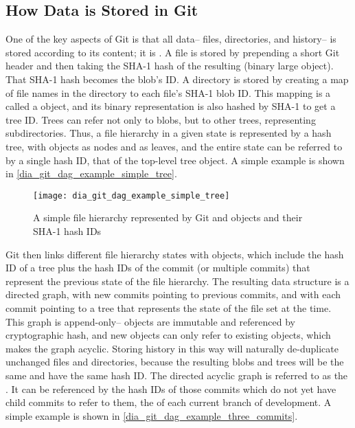 %


\subsection{How Data is Stored in Git}

One of the key aspects of Git is that all data-- files, directories, and
history-- is stored according to its content; it is . A file is stored by
prepending a short Git header and then taking the SHA-1 hash of the resulting
 (binary large object). That SHA-1 hash becomes the blob's ID. A
directory is stored by creating a map of file names in the directory to each
file's SHA-1 blob ID. This mapping is a called a  object, and its
binary representation is also hashed by SHA-1 to get a tree ID. Trees can refer
not only to blobs, but to other trees, representing subdirectories. Thus, a file
hierarchy in a given state is represented by a hash tree, with 
objects as nodes and  as leaves, and the entire state can be
referred to by a single hash ID, that of the top-level tree object. A simple
example is shown in \autoref{dia_git_dag_example_simple_tree}.

\begin{figure}[h]
    \centering
    \texttt{[image: dia\_git\_dag\_example\_simple\_tree]}
    \caption{A simple file hierarchy represented by Git  and
         objects and their SHA-1 hash IDs}
    \label{dia_git_dag_example_simple_tree}
\end{figure}

Git then links different file hierarchy states with  objects,
which include the hash ID of a tree plus the hash IDs of the commit (or multiple
commits) that represent the previous state of the file hierarchy. The resulting
data structure is a directed graph, with new commits pointing to previous
commits, and with each commit pointing to a tree that represents the state of
the file set at the time. This graph is append-only-- objects are immutable and
referenced by cryptographic hash, and new objects can only refer to existing
objects, which makes the graph acyclic. Storing history in this way will
naturally de-duplicate unchanged files and directories, because the resulting
blobs and trees will be the same and have the same hash ID. The directed acyclic
graph is referred to as the . It can be referenced by the hash IDs
of those commits which do not yet have child commits to refer to them, the
 of each current branch of development. A simple example is shown
in \autoref{dia_git_dag_example_three_commits}.

